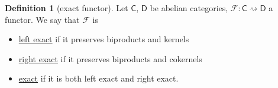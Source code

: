 \documentclass[a4paper,10pt]{scrreprt}
\newcommand{\defn}[1]{\ul{#1}}
\theoremstyle{definition}
\newtheorem{definition}{Definition}[section]
\theoremstyle{plain}
\newtheorem{theorem}{Theorem}[section]
\theoremstyle{remark}
\begin{document}
\begin{definition}[exact functor]
  \label{def:exactfunctor}
  Let $\mathsf{C}$, $\mathsf{D}$ be abelian categories, $\mathcal{F}\colon \mathsf{C} \rightsquigarrow \mathsf{D}$ a functor. We say that $\mathcal{F}$ is
  \begin{itemize}
    \item \defn{left exact} if it preserves biproducts and kernels
    \item \defn{right exact} if it preserves biproducts and cokernels
    \item \defn{exact} if it is both left exact and right exact.
  \end{itemize}
\end{definition}

%
%
\end{document}
